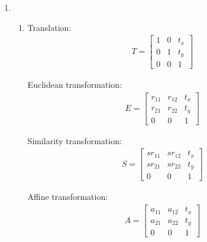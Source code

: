 \documentclass[11pt,a4paper]{article}
\begin{document}
\begin{enumerate}
      \item

            \begin{enumerate}

                  \item Translation:
                        \begin{align*}
                              T = \begin{bmatrix}
                                        1 & 0 & t_x \\
                                        0 & 1 & t_y \\
                                        0 & 0 & 1
                                  \end{bmatrix}
                        \end{align*}

                        Euclidean transformation:
                        \begin{align*}
                              E = \begin{bmatrix}
                                        r_{11} & r_{12} & t_x \\
                                        r_{21} & r_{22} & t_y \\
                                        0      & 0      & 1
                                  \end{bmatrix}
                        \end{align*}

                        Similarity transformation:
                        \begin{align*}
                              S = \begin{bmatrix}
                                        sr_{11} & sr_{12} & t_x \\
                                        sr_{21} & sr_{22} & t_y \\
                                        0       & 0       & 1
                                  \end{bmatrix}
                        \end{align*}

                        Affine transformation:
                        \begin{align*}
                              A = \begin{bmatrix}
                                        a_{11} & a_{12} & t_x \\
                                        a_{21} & a_{22} & t_y \\
                                        0      & 0      & 1
                                  \end{bmatrix}
                        \end{align*}


\end{enumerate}
\end{enumerate}
\end{document}
